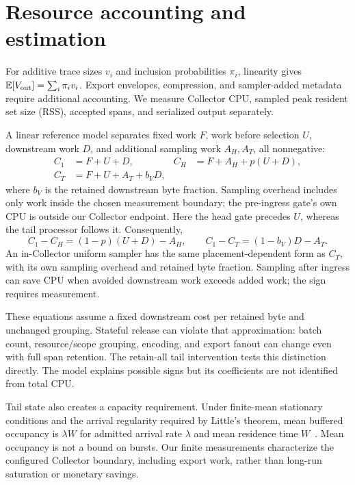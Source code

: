 \section{Resource accounting and estimation}\label{sec:cost}
For additive trace sizes $v_i$ and inclusion probabilities $\pi_i$, linearity gives $\mathbb E[V_{\rm out}]=\sum_i\pi_i v_i$. Export envelopes, compression, and sampler-added metadata require additional accounting. We measure Collector CPU, sampled peak resident set size (RSS), accepted spans, and serialized output separately.

A linear reference model separates fixed work $F$, work before selection $U$, downstream work $D$, and additional sampling work $A_H,A_T$, all nonnegative:
\begin{align}
 C_1&=F+U+D,& C_H&=F+A_H+p(U+D),\nonumber\\
 C_T&=F+U+A_T+b_VD,&&\label{eq:cost-model}
\end{align}
where $b_V$ is the retained downstream byte fraction. Sampling overhead includes only work inside the chosen measurement boundary; the pre-ingress gate's own CPU is outside our Collector endpoint. Here the head gate precedes $U$, whereas the tail processor follows it. Consequently,
\begin{equation}\label{eq:savings}
 C_1-C_H=(1-p)(U+D)-A_H,\qquad
 C_1-C_T=(1-b_V)D-A_T.
\end{equation}
An in-Collector uniform sampler has the same placement-dependent form as $C_T$, with its own sampling overhead and retained byte fraction. Sampling after ingress can save CPU when avoided downstream work exceeds added work; the sign requires measurement.

These equations assume a fixed downstream cost per retained byte and unchanged grouping. Stateful release can violate that approximation: batch count, resource/scope grouping, encoding, and export fanout can change even with full span retention. The retain-all tail intervention tests this distinction directly. The model explains possible signs but its coefficients are not identified from total CPU.

Tail state also creates a capacity requirement. Under finite-mean stationary conditions and the arrival regularity required by Little's theorem, mean buffered occupancy is $\lambda W$ for admitted arrival rate $\lambda$ and mean residence time $W$~\cite{Little1961}. Mean occupancy is not a bound on bursts. Our finite measurements characterize the configured Collector boundary, including export work, rather than long-run saturation or monetary savings.
